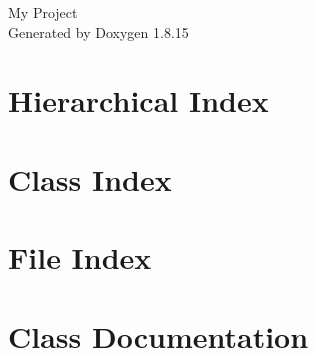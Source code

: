 \let\mypdfximage\pdfximage\def\pdfximage{\immediate\mypdfximage}\documentclass[twoside]{book}
\newcommand{\+}{\discretionary{\mbox{\scriptsize$\hookleftarrow$}}{}{}}
\newcommand{\clearemptydoublepage}{%
  \newpage{\pagestyle{empty}\cleardoublepage}%
}
\begin{document}
\hypersetup{pageanchor=false,
             bookmarksnumbered=true,
             pdfencoding=unicode
            }
\begin{titlepage}
\vspace*{7cm}
\begin{center}%
{\Large My Project }\\
\vspace*{1cm}
{\large Generated by Doxygen 1.8.15}\\
\end{center}
\end{titlepage}
\clearemptydoublepage
{}
\tableofcontents
\clearemptydoublepage
{}
\hypersetup{pageanchor=true}

\chapter{Hierarchical Index}

\chapter{Class Index}

\chapter{File Index}

\chapter{Class Documentation}





































\end{document}
